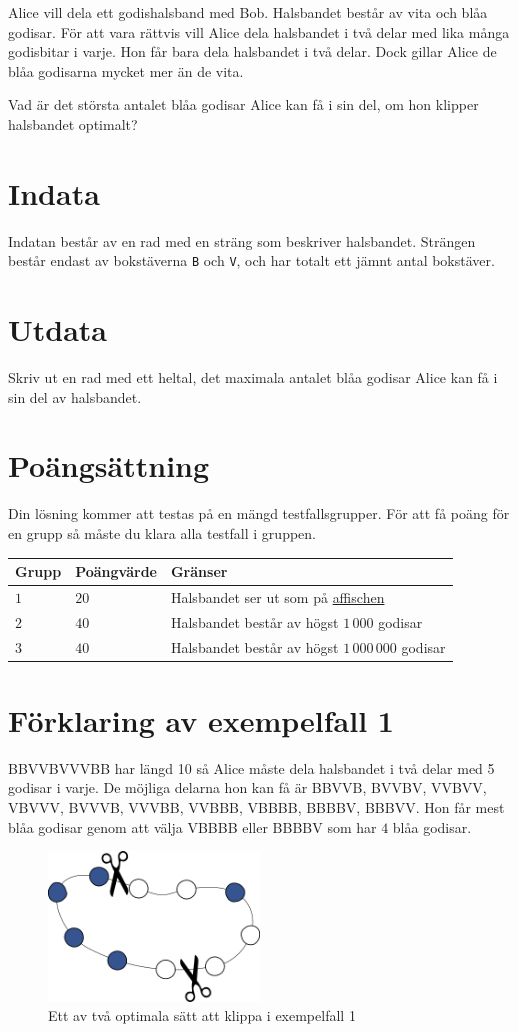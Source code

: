 Alice vill dela ett godishalsband med Bob.
Halsbandet består av vita och blåa godisar.
För att vara rättvis vill Alice dela halsbandet i två
delar med lika många godisbitar i varje.
Hon får bara dela halsbandet i två delar.
Dock gillar Alice de blåa godisarna mycket mer än de vita.

Vad är det största antalet blåa godisar Alice kan få i sin del,
om hon klipper halsbandet optimalt?

\section*{Indata}
Indatan består av en rad med en sträng som beskriver halsbandet.
Strängen består endast av bokstäverna \texttt{B} och \texttt{V},
och har totalt ett jämnt antal bokstäver.

\section*{Utdata}
Skriv ut en rad med ett heltal, det maximala antalet blåa godisar Alice
kan få i sin del av halsbandet.

\section*{Poängsättning}
Din lösning kommer att testas på en mängd testfallsgrupper.
För att få poäng för en grupp så måste du klara alla testfall i gruppen.

\noindent
\begin{tabular}{| l | l | l |}
\hline
Grupp & Poängvärde & Gränser \\ \hline
$1$   & $20$       & Halsbandet ser ut som på \href{https://www.progolymp.se/2020/affisch.pdf}{affischen} \\ \hline
$2$   & $40$       & Halsbandet består av högst $1\,000$ godisar\\ \hline
$3$   & $40$       & Halsbandet består av högst $1\,000\,000$ godisar \\ \hline
\end{tabular}

\section*{Förklaring av exempelfall 1}
BBVVBVVVBB har längd 10 så Alice måste dela halsbandet i två delar med 5 godisar i varje.
De möjliga delarna hon kan få är BBVVB, BVVBV, VVBVV, VBVVV, BVVVB, VVVBB, VVBBB, VBBBB, BBBBV, BBBVV.
Hon får mest blåa godisar genom att välja VBBBB eller BBBBV som har $4$ blåa godisar.

\begin{figure}[h]
	\centering
\includegraphics[width=0.5\textwidth]{sample1}
\caption{Ett av två optimala sätt att klippa i exempelfall 1}
\end{figure}

